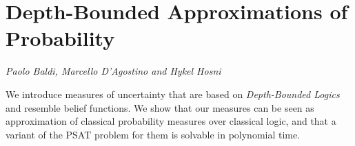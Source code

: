 \documentclass[../booklet.tex]{subfiles}
\begin{document}
\section[Depth-Bounded Approximations of Probability. {\it Paolo Baldi, Marcello D'Agostino and Hykel Hosni}]{Depth-Bounded Approximations of Probability}
  

\begin{center}
  {\it Paolo Baldi, Marcello D'Agostino and Hykel Hosni}
\end{center}

\vskip 0.8cm


We introduce measures of uncertainty that are based on {\em Depth-Bounded Logics} \cite{DFG13} and resemble belief functions. We show that our measures can be seen as approximation of classical probability measures over classical logic, and that 
a variant of the PSAT \cite{hansen2000} problem for them is solvable in polynomial time. 
\end{document}
